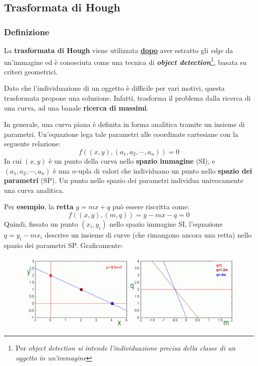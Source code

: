 \documentclass[a4paper]{article}
\begin{document}
	\subsection{Trasformata di Hough}
	
	\subsubsection{Definizione}
	
	La \textcolor{Red3}{\textbf{trasformata di Hough}} viene utilizzata \textbf{\underline{dopo}} aver estratto gli \emph{edge} da un'immagine ed è conosciuta come una tecnica di \textbf{\emph{object detection}}\footnote{Per \emph{object detection si intende l'individuazione precisa della classe di un oggetto in un'immagine}}, basata su criteri geometrici.\newline
	
	\noindent
	Dato che l'individuazione di un oggetto è difficile per vari motivi, questa trasformata propone una soluzione. Infatti, trasforma il problema dalla ricerca di una curva, ad una banale \textbf{ricerca di massimi}.\newline
	
	\noindent
	In generale, una curva piana è definita in forma analitica tramite un insieme di parametri. Un'equazione lega tale parametri alle coordinate cartesiane con la seguente relazione: 
	\begin{equation*}
		f\left(\left(x,y\right), \left(a_{1}, a_{2}, \cdots, a_{n}\right)\right) = 0
	\end{equation*}
	In cui $\left(x,y\right)$ è un punto della curva nello \textbf{spazio immagine} (SI), e $\left(a_{1}, a_{2}, \cdots, a_{n}\right)$ è una $n$-upla di valori che individuano un punto nello \textbf{spazio dei parametri} (SP). Un punto nello spazio dei parametri individua univocamente una curva analitica.\newline
	
	\noindent
	Per \textcolor{Green4}{\textbf{esempio}}, la \textbf{retta} $y = mx + q$ può essere riscritta come:
	\begin{equation*}
		f\left(\left(x,y\right), \left(m,q\right)\right) = y - mx - q = 0
	\end{equation*}
	Quindi, fissato un punto $\left(x_{i},y_{i}\right)$ nello spazio immagine SI, l'equazione $q = y_{i} - mx_{i}$ descrive un insieme di curve (che rimangono ancora una retta) nello spazio dei parametri SP. Graficamente:
	\begin{figure}[!htp]
		\centering
		\includegraphics[width=\textwidth]{img/esempio_si-sp.png}
	\end{figure}\newpage
	
\end{document}
